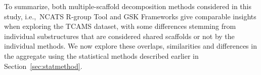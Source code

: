 \documentclass[journal=jacsat,manuscript=article]{achemso}
\newcommand*\fref[1]{Figure~\ref{fig:#1}}
\newcommand*\sref[1]{Section~\ref{sec:#1}}
\newcommand*\ie{i.e.,~}
\begin{document}
%


To summarize, both multiple-scaffold decomposition methods considered in this study, \ie NCATS R-group Tool and GSK Frameworks give comparable insights when exploring the TCAMS dataset, with some differences stemming from individual substructures that are considered shared scaffolds or not by the individual methods.  We now explore these overlaps, similarities and differences in the aggregate using the statistical methods described earlier in \sref{statmethod}.
\end{document}
